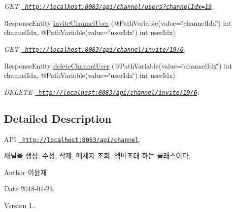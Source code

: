 \begin{DoxyCompactItemize}
\begin{DoxyCompactList}\small\item\em G\+ET \href{http://localhost:8083/api/channel/users?channelIdx=19}{\texttt{ http\+://localhost\+:8083/api/channel/users?channel\+Idx=19}}. \end{DoxyCompactList}\item 
Response\+Entity \mbox{\hyperlink{classcom_1_1aomc_1_1coop_1_1controller_1_1_channel_controller_ac77a77fea57ead2a28ca054029fabba9}{invite\+Channel\+User}} (@Path\+Variable(value=\char`\"{}channel\+Idx\char`\"{}) int channel\+Idx, @Path\+Variable(value=\char`\"{}user\+Idx\char`\"{}) int user\+Idx)
\begin{DoxyCompactList}\small\item\em G\+ET \href{http://localhost:8083/api/channel/invite/19/6}{\texttt{ http\+://localhost\+:8083/api/channel/invite/19/6}}. \end{DoxyCompactList}\item 
Response\+Entity \mbox{\hyperlink{classcom_1_1aomc_1_1coop_1_1controller_1_1_channel_controller_afc894dd365c724ec7dfbf6c75f0d430c}{delete\+Channel\+User}} (@Path\+Variable(value=\char`\"{}channel\+Idx\char`\"{}) int channel\+Idx, @Path\+Variable(value=\char`\"{}user\+Idx\char`\"{}) int user\+Idx)
\begin{DoxyCompactList}\small\item\em D\+E\+L\+E\+TE \href{http://localhost:8083/api/channel/invite/19/6}{\texttt{ http\+://localhost\+:8083/api/channel/invite/19/6}}. \end{DoxyCompactList}\end{DoxyCompactItemize}


\subsection{Detailed Description}
A\+PI \href{http://localhost:8083/api/channel}{\texttt{ http\+://localhost\+:8083/api/channel}}. 

채널을 생성, 수정, 삭제, 메세지 조회, 멤버초대 하는 클래스이다.

\begin{DoxyAuthor}{Author}
이윤재
\end{DoxyAuthor}
\begin{DoxyDate}{Date}
2018-\/01-\/23
\end{DoxyDate}
\begin{DoxyVersion}{Version}
1.. 
\end{DoxyVersion}


